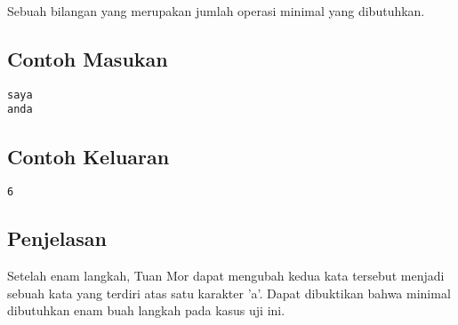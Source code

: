 \documentclass{article}
\begin{document}
Sebuah bilangan yang merupakan jumlah operasi minimal yang dibutuhkan.
\\

\begin{multicols}{2}
\subsection*{Contoh Masukan}
\begin{lstlisting}
saya
anda
\end{lstlisting}
\columnbreak
\subsection*{Contoh Keluaran}
\begin{lstlisting}
6
\end{lstlisting}
\vfill
\null
\end{multicols}

\subsection*{Penjelasan}
Setelah enam langkah, Tuan Mor dapat mengubah kedua kata tersebut menjadi sebuah kata yang terdiri atas satu karakter 'a'.
Dapat dibuktikan bahwa minimal dibutuhkan enam buah langkah pada kasus uji ini.

\pagebreak
\end{document}
